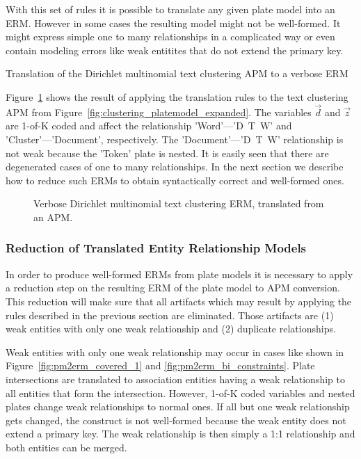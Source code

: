 With this set of rules it is possible to translate any given plate model into an ERM. However in some cases the resulting model might not be well-formed. It might express simple one to many relationships in a complicated way or even contain modeling errors like weak entitites that do not extend the primary key.

\begin{Example} Translation of the Dirichlet multinomial text clustering APM to a verbose ERM

Figure~\ref{fig:clustering_erm_good_verbose} shows the result of applying the translation rules to the text clustering APM from Figure~\ref{fig:clustering_platemodel_expanded}. The variables $\vec d$ and $\vec z$ are 1-of-K coded and affect the relationship 'Word'---'D~T~W' and 'Cluster'---'Document', respectively. The 'Document'---'D~T~W' relationship is not weak because the 'Token' plate is nested. It is easily seen that there are degenerated cases of one to many relationships. In the next section we describe how to reduce such ERMs to obtain syntactically correct and well-formed ones.

\end{Example}

\begin{figure}[h]
\centering
\scalebox{\tikzScale}{\adjustTikzSize }
\caption{Verbose Dirichlet multinomial text clustering ERM, translated from an APM.}\label{fig:clustering_erm_good_verbose}
\end{figure}

\subsubsection{Reduction of Translated Entity Relationship Models}
\label{sec:erm_reduction}

In order to produce well-formed ERMs from plate models it is necessary to apply a reduction step on the resulting ERM of the plate model to APM conversion. This reduction will make sure that all artifacts which may result by applying the rules described in the previous section are eliminated. Those artifacts are (1) weak entities with only one weak relationship and (2) duplicate relationships.

Weak entities with only one weak relationship may occur in cases like shown in Figure~\ref{fig:pm2erm_covered_1} and \ref{fig:pm2erm_bi_constraints}. Plate intersections are translated to association entities having a weak relationship to all entities that form the intersection. However, 1-of-K coded variables and nested plates change weak relationships to normal ones. If all but one weak relationship gets changed, the construct is not well-formed because the weak entity does not extend a primary key. The weak relationship is then simply a 1:1 relationship and both entities can be merged.

